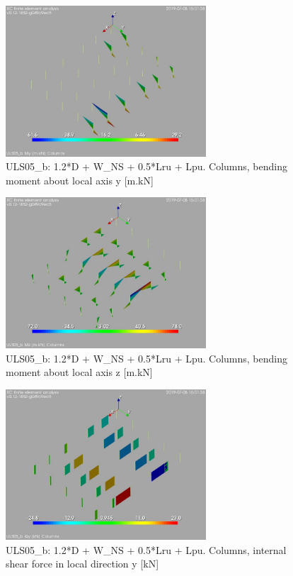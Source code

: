 \begin{figure}
\begin{center}
\includegraphics[width=75mm]{annex_res_columns/graphics/resSimplLC/ULS05_bcolumnsMy}
\caption{ULS05\_b: 1.2*D + W\_NS + 0.5*Lru + Lpu. Columns, bending moment about local axis y [m.kN]}
\end{center}
\end{figure}
\begin{figure}
\begin{center}
\includegraphics[width=75mm]{annex_res_columns/graphics/resSimplLC/ULS05_bcolumnsMz}
\caption{ULS05\_b: 1.2*D + W\_NS + 0.5*Lru + Lpu. Columns, bending moment about local axis z [m.kN]}
\end{center}
\end{figure}
\begin{figure}
\begin{center}
\includegraphics[width=75mm]{annex_res_columns/graphics/resSimplLC/ULS05_bcolumnsQy}
\caption{ULS05\_b: 1.2*D + W\_NS + 0.5*Lru + Lpu. Columns, internal shear force in local direction y [kN]}
\end{center}
\end{figure}
